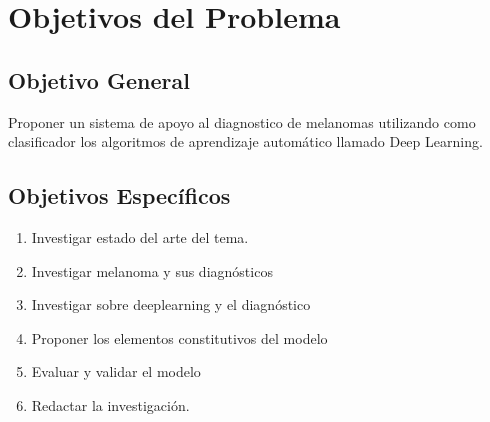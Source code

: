 \documentclass[a4paper]{article}
\begin{document}
\section{Objetivos del Problema}
\subsection{Objetivo General}

Proponer un sistema de apoyo al diagnostico de melanomas utilizando como clasificador los algoritmos de aprendizaje automático llamado Deep Learning.
\subsection{Objetivos Específicos}
\begin{enumerate}
\item Investigar estado del arte del tema.
\item Investigar melanoma y sus diagnósticos
\item Investigar sobre deeplearning y el diagnóstico
\item Proponer los elementos constitutivos del modelo
\item Evaluar y validar el modelo
\item Redactar la investigación.

\end{enumerate}



\end{document}
